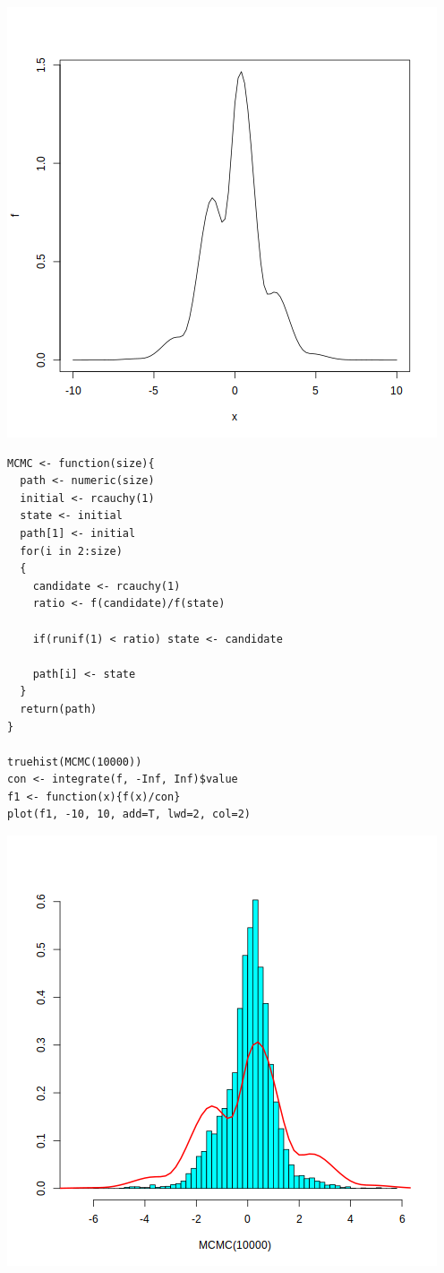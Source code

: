 \documentclass[11pt]{article}
\begin{document}
\begin{center}
\includegraphics[width=.9\linewidth]{fig1.png}
\end{center}


\begin{verbatim}
MCMC <- function(size){
  path <- numeric(size)
  initial <- rcauchy(1)
  state <- initial
  path[1] <- initial
  for(i in 2:size)
  {
    candidate <- rcauchy(1)
    ratio <- f(candidate)/f(state)

    if(runif(1) < ratio) state <- candidate

    path[i] <- state
  }
  return(path)
}

truehist(MCMC(10000))
con <- integrate(f, -Inf, Inf)$value
f1 <- function(x){f(x)/con}
plot(f1, -10, 10, add=T, lwd=2, col=2)
\end{verbatim}

\begin{center}
\includegraphics[width=.9\linewidth]{fig2.png}
\end{center}
\end{document}

